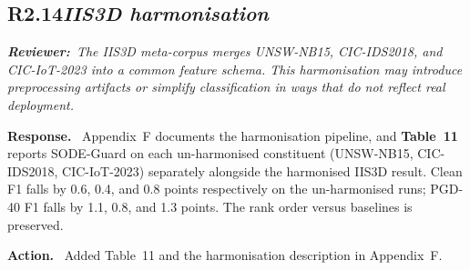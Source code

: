 \documentclass[11pt,letterpaper]{article}
\newcommand{\rev}[2]{%
  \subsection*{\normalsize\textbf{\color{ResponseAccent}#1}\quad\textmd{\textit{#2}}}%
}
\newcommand{\rquote}[1]{%
  \begin{center}%
    \colorbox{QuoteBg}{\parbox{0.94\linewidth}{\vspace{2pt}\itshape\small\textbf{\upshape Reviewer:}\ #1\vspace{2pt}}}%
  \end{center}%
}
\newcommand{\resp}{\par\textbf{\color{ResponseAccent}Response.}\ }
\newcommand{\action}{\par\textbf{\color{ResponseAccent}Action.}\ }
\begin{document}
\rev{R2.14}{IIS3D harmonisation}
\rquote{The IIS3D meta-corpus merges UNSW-NB15, CIC-IDS2018, and
CIC-IoT-2023 into a common feature schema. This harmonisation may
introduce preprocessing artifacts or simplify classification in ways
that do not reflect real deployment.}

\resp
Appendix~F documents the harmonisation pipeline, and
\textbf{Table~11} reports SODE-Guard on each un-harmonised constituent
(UNSW-NB15, CIC-IDS2018, CIC-IoT-2023) separately alongside the
harmonised IIS3D result. Clean F1 falls by 0.6, 0.4, and 0.8 points
respectively on the un-harmonised runs; PGD-40 F1 falls by 1.1, 0.8,
and 1.3 points. The rank order versus baselines is preserved.
\action
Added Table~11 and the harmonisation description in Appendix~F.

\end{document}
